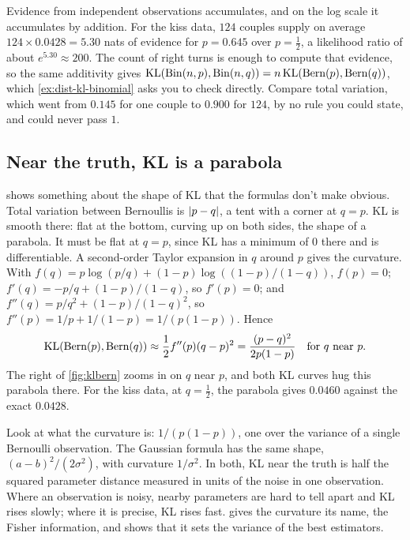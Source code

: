 Evidence from independent observations accumulates, and on the log scale it accumulates by addition.
For the kiss data, $124$ couples supply on average $124 \times 0.0428 = 5.30$ nats of evidence for $p = 0.645$ over $p = \frac12$, a likelihood ratio of about $e^{5.30} \approx 200$.
The count of right turns is enough to compute that evidence, so the same additivity gives $\mathrm{KL}(\mathrm{Bin}(n, p), \mathrm{Bin}(n, q)) = n\, \mathrm{KL}(\text{Bern}(p), \text{Bern}(q))$, which \cref{ex:dist-kl-binomial} asks you to check directly.
Compare total variation, which went from $0.145$ for one couple to $0.900$ for $124$, by no rule you could state, and could never pass $1$.

\subsection{Near the truth, KL is a parabola}

 shows something about the shape of KL that the formulas don't make obvious.
Total variation between Bernoullis is $\lvert p - q\rvert$, a tent with a corner at $q = p$.
KL is smooth there: flat at the bottom, curving up on both sides, the shape of a parabola.
It must be flat at $q = p$, since KL has a minimum of $0$ there and is differentiable.
A second-order Taylor expansion  in $q$ around $p$ gives the curvature.
With $f(q) = p \log(p/q) + (1-p)\log((1-p)/(1-q))$, $f(p) = 0$; $f'(q) = -p/q + (1-p)/(1-q)$, so $f'(p) = 0$; and $f''(q) = p/q^2 + (1-p)/(1-q)^2$, so $f''(p) = 1/p + 1/(1-p) = 1/(p(1-p))$.
Hence
\[
\mathrm{KL}(\text{Bern}(p), \text{Bern}(q)) \approx \frac12 f''(p) (q - p)^2 = \frac{(p - q)^2}{2p(1 - p)} \quad \text{for $q$ near $p$}.
\]
The right of \cref{fig:klbern} zooms in on $q$ near $p$, and both KL curves hug this parabola there.
For the kiss data, at $q = \frac12$, the parabola gives $0.0460$ against the exact $0.0428$.

Look at what the curvature is: $1/(p(1-p))$, one over the variance of a single Bernoulli observation.
The Gaussian formula has the same shape, $(a - b)^2/(2\sigma^2)$, with curvature $1/\sigma^2$.
In both, KL near the truth is half the squared parameter distance measured in units of the noise in one observation.
Where an observation is noisy, nearby parameters are hard to tell apart and KL rises slowly; where it is precise, KL rises fast.
 gives the curvature its name, the Fisher information, and shows that it sets the variance of the best estimators.

